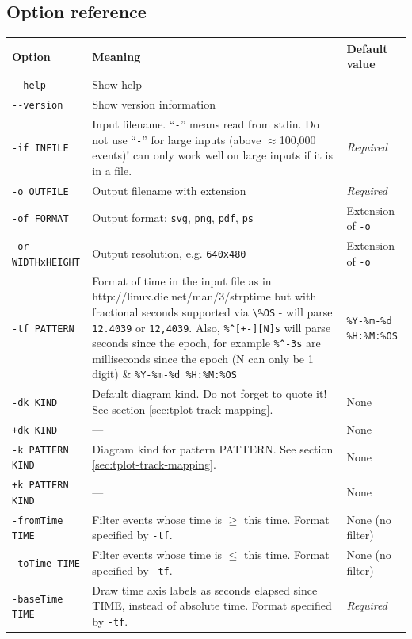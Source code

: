 \documentclass{article}
\begin{document}
\subsection{Option reference}
\begin{longtable}{|l|p{160px}|l|}
\hline
\textbf{Option} & \textbf{Meaning} & \textbf{Default value} \\
\hline
\endhead
\verb|--help| & Show help & \\
\hline
\verb|--version| & Show version information & \\
\hline
\verb|-if INFILE| & Input filename. ``\texttt{-}'' means read from stdin. Do not use ``\texttt{-}'' for large inputs (above $\approx$100,000 events)! \timeplot{} can only work well on large inputs if it is in a file. & \emph{Required} \\
\hline
\verb|-o OUTFILE| & Output filename with extension & \emph{Required} \\
\hline
\verb|-of FORMAT| & Output format: \texttt{svg}, \texttt{png}, \texttt{pdf}, \texttt{ps} & Extension of \texttt{-o} \\
\hline
\verb|-or WIDTHxHEIGHT| & Output resolution, e.g. \texttt{640x480} & Extension of \texttt{-o} \\
\hline
\verb|-tf PATTERN| & Format of time in the input file as in http://linux.die.net/man/3/strptime but with fractional seconds supported via \verb|\%OS| - will parse \verb|12.4039| or \verb|12,4039|.  Also, \verb|%^[+-][N]s| will parse seconds since the epoch, for example \verb|%^-3s| are milliseconds since the epoch (N can only be 1 digit) & \verb|%Y-%m-%d %H:%M:%OS| \\
\hline
\verb|-dk KIND| & Default diagram kind. Do not forget to quote it! See section \ref{sec:tplot-track-mapping}. & None \\
\hline
\verb|+dk KIND| & --- & None \\
\hline
\verb|-k PATTERN KIND| & Diagram kind for pattern PATTERN. See section \ref{sec:tplot-track-mapping}. & None \\
\hline
\verb|+k PATTERN KIND| & --- & None \\
\hline
\verb|-fromTime TIME| & Filter events whose time is $\ge$ this time. Format specified by \texttt{-tf}. & None (no filter) \\
\hline
\verb|-toTime TIME| & Filter events whose time is $\le$ this time. Format specified by \texttt{-tf}. & None (no filter) \\
\hline
\verb|-baseTime TIME| & Draw time axis labels as seconds elapsed since TIME, instead of absolute time. Format specified by \texttt{-tf}. & \emph{Required} \\
\hline
\end{longtable}
\end{document}
